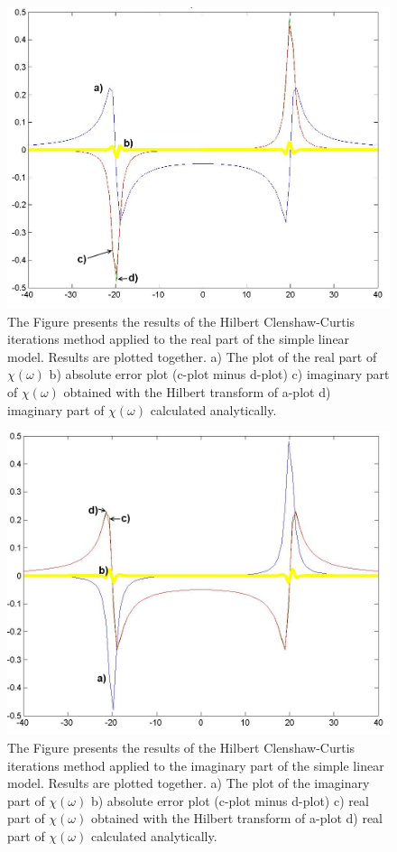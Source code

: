 \documentclass[12pt,twoside,a4paper]{article}
\numberwithin{equation}{subsection}
\numberwithin{figure}{subsection}
\begin{document}
\begin{figure} 
  \includegraphics[width=150mm]{img/hcc_lin1.png}
  \caption{The Figure presents the results of the Hilbert Clenshaw-Curtis iterations method applied to the real part of the simple linear
  model. Results are plotted together.
   a) The plot of the real part of $\chi (\omega )$ 
   b) absolute error plot (c-plot minus d-plot) 
   c) imaginary part of $\chi (\omega )$ obtained with the Hilbert transform of a-plot 
   d) imaginary part of $\chi (\omega )$  calculated analytically. \label{fig:cci_lin1}
  }
\end{figure}

\begin{figure} 
  \includegraphics[width=150mm]{img/hcc_lin2.png}
  \caption{The Figure presents the results of the Hilbert Clenshaw-Curtis iterations method applied to the imaginary part of the simple
  linear model. Results are plotted together.
   a) The plot of the imaginary part of $\chi (\omega )$ 
   b) absolute error plot (c-plot minus d-plot) 
   c) real part of $\chi (\omega )$ obtained with the Hilbert transform of a-plot 
   d) real part of $\chi (\omega )$ calculated analytically. \label{fig:cci_lin2}
  }
\end{figure}
\end{document}
